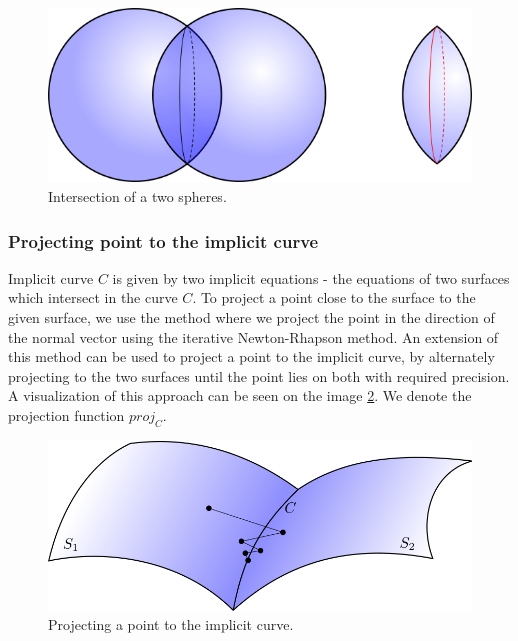 \begin{figure}
    \centerline{\includegraphics[scale=0.5]{images/img35}}
    \caption[Intersection of a two spheres]
    {Intersection of a two spheres.}
    \label{img:35}
\end{figure}

\subsubsection{Projecting point to the implicit curve}

Implicit curve $C$ is given by two implicit equations - the equations of two surfaces
which intersect in the curve $C$.
To project a point close to the surface to the given surface, we use the method where
we project the point in the direction of the normal vector using the iterative 
Newton-Rhapson method. An extension of this method can be used to project a point
to the implicit curve, by alternately projecting to the two surfaces until the
point lies on both with required precision. A visualization of this approach can be
seen on the image \ref{img:36}. We denote the projection function $proj_C$.

\begin{figure}
    \centerline{\includegraphics[scale=0.5]{images/img36}}
    \caption[Projecting a point to the implicit curve]
    {Projecting a point to the implicit curve.}
    \label{img:36}
\end{figure}

